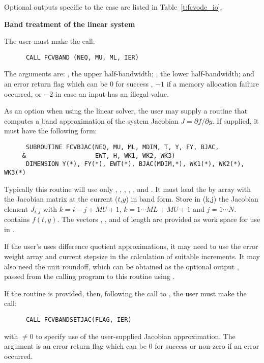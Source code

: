 \begin{Steps}
  Optional outputs specific to the {\dense} case are listed in Table~\ref{t:fcvode_io}.

  {\s} {\bf Band treatment of the linear system}
  
  The user must make the call:
\begin{verbatim}
      CALL FCVBAND (NEQ, MU, ML, IER)
\end{verbatim}
  The arguments are: , the upper half-bandwidth; , 
  the lower half-bandwidth; and  an error return flag which can be  
  $0$ for success , $-1$ if a memory allocation failure occurred, or $-2$ 
  in case an input has an illegal value.     
  
  As an option when using the {\band} linear solver, the user may supply a
  routine that computes a band approximation of the system Jacobian 
  $J = \partial f / \partial y$. If supplied, it must have the following form:
\begin{verbatim}
      SUBROUTINE FCVBJAC(NEQ, MU, ML, MDIM, T, Y, FY, BJAC,
     &                   EWT, H, WK1, WK2, WK3)
      DIMENSION Y(*), FY(*), EWT(*), BJAC(MDIM,*), WK1(*), WK2(*), WK3(*)
\end{verbatim}
  Typically this routine will use only , , , , 
  , and . 
  It must load the  by  array  with the Jacobian matrix
  at the current ($t$,$y$) in band form.  Store in (k,j) the Jacobian
  element $J_{i,j}$ with $k = i - j + MU + 1$, $k = 1 \cdots ML+MU+1$ and
  $j = 1 \cdots N$.  contains $f(t,y)$. The vectors , ,
  and  of length  are provided as work space for use in
  .

  If the user's  uses difference quotient approximations, it
  may need to use the error weight array  and current stepsize 
  in the calculation of suitable increments.  It may also need the unit
  roundoff, which can be obtained as the optional output ,
  passed from the calling program to this routine using .

  If the  routine is provided, then, following the call to ,
  the user must make the call:
\begin{verbatim}
      CALL FCVBANDSETJAC(FLAG, IER)
\end{verbatim}
  with  $\neq 0$ to specify use of the user-supplied Jacobian approximation.
  The argument  is an error return flag which can be $0$ 
  for success or non-zero if an error occurred.
  

\end{Steps}
